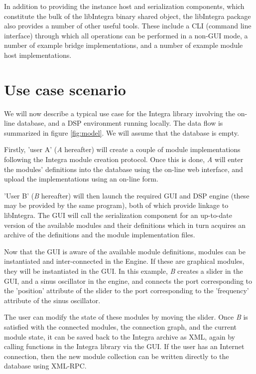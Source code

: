 In addition to providing the instance host and serialization
components, which constitute the bulk of the libIntegra binary shared
object, the libIntegra package also provides a number of other useful
tools. These include a CLI (command line interface) through which all
operations can be performed in a non-GUI mode, a number of example
bridge implementations, and a number of example module host
implementations.

\section{Use case scenario}\label{sec:use_case}

We will now describe a typical use case for the Integra library
involving the on-line database, and a DSP environment running locally.
The data flow is summarized in figure \ref{fig:model}. We will assume
that the database is empty.

Firstly, 'user A' (\emph{A} hereafter) will create a couple of module
implementations following the Integra module creation protocol. Once
this is done, \emph{A} will enter the modules' definitions into the
database using the on-line web interface, and upload the
implementations using an on-line form.

'User B' (\emph{B} hereafter) will then launch the required GUI and
DSP engine (these may be provided by the same program), both of which
provide linkage to libIntegra. The GUI will call the serialization
component for an up-to-date version of the available modules and their
definitions which in turn acquires an archive of the definitions and
the module implementation files.

Now that the GUI is aware of the available module definitions, modules
can be instantiated and inter-connected in the Engine. If these are
graphical modules, they will be instantiated in the GUI. In this
example, \emph{B} creates a slider in the GUI, and a sinus oscillator
in the engine, and connects the port corresponding to the 'position'
attribute of the slider to the port corresponding to the 'frequency'
attribute of the sinus oscillator.

The user can modify the state of these modules by moving the slider.
Once \emph{B} is satisfied with the connected modules, the connection
graph, and the current module state, it can be saved back to the
Integra archive as XML, again by calling functions in the Integra
library via the GUI. If the user has an Internet connection, then the
new module collection can be written directly to the database using
XML-RPC.

